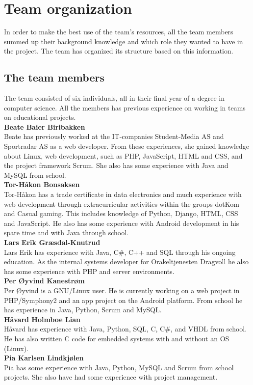 \newpage
\section{Team organization}
In order to make the best use of the team's resources, all the team members summed up their background knowledge and which role they wanted to have in the project. The team has organized its structure based on this information.

\subsection{The team members}
The team consisted of six individuals, all in their final year of a degree in computer science. All the members has previous experience on working in teams on educational projects.\\

\noindent\textbf{Beate Baier Biribakken}\\
Beate has previously worked at the IT-companies Student-Media AS and Sportradar AS as a web developer. From these experiences, she gained knowledge about Linux, web development, such as PHP, JavaScript, HTML and CSS, and the project framework Scrum. She also has some experience with Java and MySQL from school.\\

\noindent\textbf{Tor-Håkon Bonsaksen}\\
Tor-Håkon has a trade certificate in data electronics and much experience with web development through extracurricular activities within the groups dotKom and Casual gaming. This includes knowledge of Python, Django, HTML, CSS and JavaScript. He also has some experience with Android development in his spare time and with Java through school.\\

\noindent\textbf{Lars Erik Græsdal-Knutrud}\\
Lars Erik has experience with Java, C\#, C++ and SQL through his ongoing education. As the internal systems developer for Orakeltjenesten Dragvoll he also has some experience with PHP and server environments. \\

\noindent\textbf{Per Øyvind Kanestrøm}\\
Per Øyvind is a GNU/Linux user. He is currently working on a web project in PHP/Symphony2 and an app project on the Android platform. From school he has experience in Java, Python, Scrum and MySQL.\\

\noindent\textbf{Håvard Holmboe Lian}\\
Håvard has experience with Java, Python, SQL, C, C\#, and VHDL from school. He has also written C code for embedded systems with and without an OS (Linux).\\ 

\noindent\textbf{Pia	Karlsen	Lindkjølen}\\
Pia has some experience with Java, Python, MySQL and Scrum from school projects. She also have had some experience with project management. 